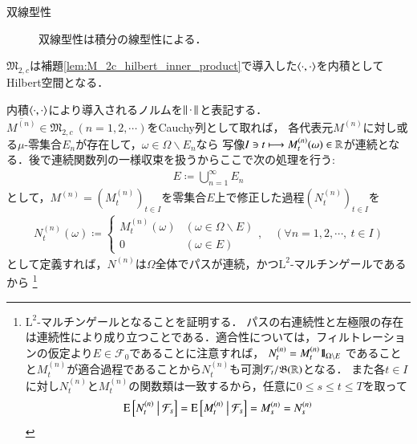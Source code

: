\begin{prf}
\begin{description}
			\item[双線型性]
				双線型性は積分の線型性による．
			\end{description}
		\QED
	\end{prf}
		
	\begin{screen}
		\begin{prp}
			$\mathfrak{M}_{2,c}$は補題\ref{lem:M_2c_hilbert_inner_product}で導入した$\inprod<\cdot,\cdot>$を内積としてHilbert空間となる．
		\end{prp}
	\end{screen}
			
	\begin{prf}
			内積$\inprod<\cdot,\cdot>$により導入されるノルムを$\left\|\, \cdot\, \right\|_{}$と表記する．
			$\overline{M^{(n)}} \in \mathfrak{M}_{2,c}\ (n=1,2,\cdots)$をCauchy列として取れば，
			各代表元$M^{(n)}$に対し或る$\mu$-零集合$E_n$が存在して，$\omega \in \Omega \backslash E_n$なら
			写像$I \ni t \longmapsto M^{(n)}_t(\omega) \in \mathbb{R}$が連続となる．後で連続関数列の一様収束を扱うからここで次の処理を行う:
			\begin{align}
				E \coloneqq \bigcup_{n=1}^{\infty} E_n
			\end{align}
			として，$M^{(n)} = (M^{(n)}_t)_{t \in I}$を零集合$E$上で修正した過程$(N^{(n)}_t)_{t \in I}$を
			\begin{align}
				N^{(n)}_t(\omega) \coloneqq
				\begin{cases}
					M^{(n)}_t(\omega) & (\omega \in \Omega \backslash E) \\
					0 & (\omega \in E)
				\end{cases}
				,\quad (\forall n = 1,2,\cdots,\ t \in I)
			\end{align}
		として定義すれば，$N^{(n)}$は$\Omega$全体でパスが連続，かつ$\mathrm{L}^2$-マルチンゲールであるから
		\footnote{
			$\mathrm{L}^2$-マルチンゲールとなることを証明する．
			パスの右連続性と左極限の存在は連続性により成り立つことである．適合性については，フィルトレーションの仮定より$E \in \mathcal{F}_0$であることに注意すれば，
			$N^{(n)}_t = M^{(n)}_t \mbox{1}\hspace{-0.25em}\mbox{l}_{\Omega \backslash E}$
			であることと$M^{(n)}_t$が適合過程であることから$N^{(n)}_t$も可測$\mathcal{F}_t/\mathfrak{B}(\mathbb{R})$となる．
			また各$t \in I$に対し$N^{(n)}_t$と$M^{(n)}_t$の関数類は一致するから，任意に$0 \leq s \leq t \leq T$を取って
			\begin{align}
				\operatorname{E} \left[ N^{(n)}_t \ \middle|\ \mathcal{F}_s \right] = \operatorname{E} \left[ M^{(n)}_t \ \middle|\ \mathcal{F}_s \right] = M^{(n)}_s = N^{(n)}_s
			\end{align}
}
\end{prf}
